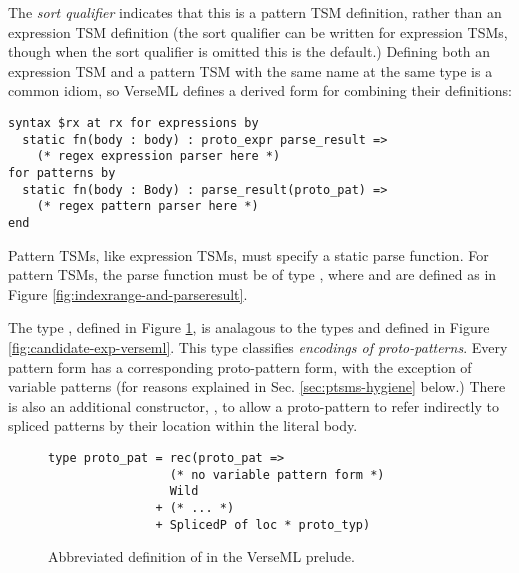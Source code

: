 {The \emph{sort qualifier}  indicates that this is a pattern TSM definition, rather than an expression TSM definition (the sort qualifier  can be written for expression TSMs, though when the sort qualifier is omitted this is the default.) Defining both an expression TSM and a pattern TSM with the same name at the same type is a common idiom, so VerseML defines a derived form for combining their definitions:
\begin{lstlisting}[numbers=none,morekeywords={andfor}]
syntax $rx at rx for expressions by
  static fn(body : body) : proto_expr parse_result => 
    (* regex expression parser here *)
for patterns by 
  static fn(body : Body) : parse_result(proto_pat) => 
    (* regex pattern parser here *)
end
\end{lstlisting}

Pattern TSMs, like expression TSMs, must specify a static {parse function}. For pattern TSMs, the parse function must be of type , where  and  are defined as in Figure \ref{fig:indexrange-and-parseresult}. 

The type , defined in Figure \ref{fig:CEPat}, is analagous to the types  and  defined in Figure \ref{fig:candidate-exp-verseml}. This type classifies \emph{encodings of proto-patterns}. Every pattern form has a corresponding proto-pattern form, with the exception of variable patterns (for reasons explained in Sec. \ref{sec:ptsms-hygiene} below.) There is also an additional constructor, , to allow a proto-pattern to refer indirectly to spliced patterns by their location within the literal body.

\begin{figure}
\begin{lstlisting}[numbers=none]
type proto_pat = rec(proto_pat => 
                 (* no variable pattern form *) 
                 Wild
               + (* ... *)
               + SplicedP of loc * proto_typ)
\end{lstlisting}
\caption[Abbreviated definition of  in VerseML]{Abbreviated definition of  in the VerseML prelude.}
\label{fig:CEPat}
\end{figure}

}
